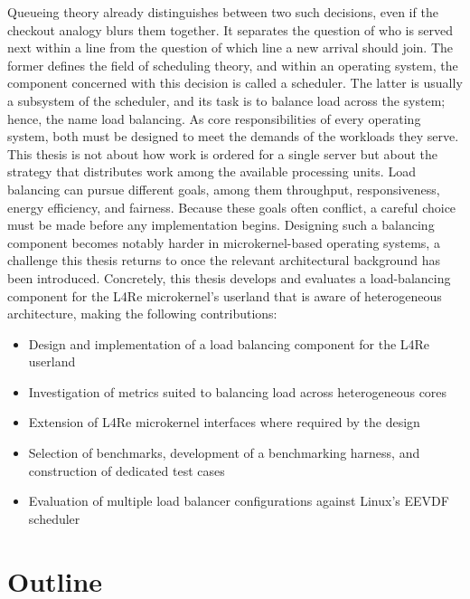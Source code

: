Queueing theory already distinguishes between two such decisions, even if the checkout analogy blurs them together.
It separates the question of who is served next within a line from the question of which line a new arrival should join.
The former defines the field of scheduling theory, and within an operating system, the component concerned with this decision is called a scheduler.
The latter is usually a subsystem of the scheduler, and its task is to balance load across the system; hence, the name load balancing.
As core responsibilities of every operating system, both must be designed to meet the demands of the workloads they serve.
This thesis is not about how work is ordered for a single server but about the strategy that distributes work among the available processing units.
Load balancing can pursue different goals, among them throughput, responsiveness, energy efficiency, and fairness.
Because these goals often conflict, a careful choice must be made before any implementation begins.
Designing such a balancing component becomes notably harder in microkernel-based operating systems, a challenge this thesis returns to once the relevant architectural background has been introduced.
Concretely, this thesis develops and evaluates a load-balancing component for the L4Re microkernel's userland that is aware of heterogeneous architecture, making the following contributions:

\begin{itemize}
	\item Design and implementation of a load balancing component for the L4Re userland
	\item Investigation of metrics suited to balancing load across heterogeneous cores
	\item Extension of L4Re microkernel interfaces where required by the design
	\item Selection of benchmarks, development of a benchmarking harness, and construction of dedicated test cases
	\item Evaluation of multiple load balancer configurations against Linux's EEVDF scheduler
\end{itemize}

\section{Outline}

